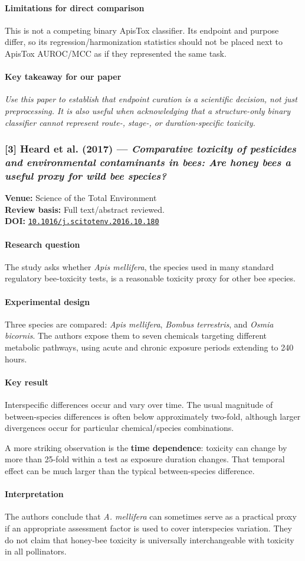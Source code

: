 \documentclass[11pt]{article}
\newcommand{\reviewfield}[2]{\paragraph{#1}#2}
\newcommand{\keytakeaway}[1]{\paragraph{Key takeaway for our paper}\emph{#1}}
\newcommand{\paperdoi}[1]{\href{https://doi.org/#1}{\texttt{#1}}}
\begin{document}
\reviewfield{Limitations for direct comparison}{
This is not a competing binary ApisTox classifier. Its endpoint and purpose differ, so its regression/harmonization statistics should not be placed next to ApisTox AUROC/MCC as if they represented the same task.
}

\keytakeaway{Use this paper to establish that endpoint curation is a scientific decision, not just preprocessing. It is also useful when acknowledging that a structure-only binary classifier cannot represent route-, stage-, or duration-specific toxicity.}

\subsubsection{[3] Heard et al. (2017) --- \textit{Comparative toxicity of pesticides and environmental contaminants in bees: Are honey bees a useful proxy for wild bee species?}}
\textbf{Venue:} Science of the Total Environment\\
\textbf{Review basis:} Full text/abstract reviewed.\\
\textbf{DOI:} \paperdoi{10.1016/j.scitotenv.2016.10.180}

\reviewfield{Research question}{
The study asks whether \textit{Apis mellifera}, the species used in many standard regulatory bee-toxicity tests, is a reasonable toxicity proxy for other bee species.
}

\reviewfield{Experimental design}{
Three species are compared: \textit{Apis mellifera}, \textit{Bombus terrestris}, and \textit{Osmia bicornis}. The authors expose them to seven chemicals targeting different metabolic pathways, using acute and chronic exposure periods extending to 240 hours.
}

\reviewfield{Key result}{
Interspecific differences occur and vary over time. The usual magnitude of between-species differences is often below approximately two-fold, although larger divergences occur for particular chemical/species combinations.

A more striking observation is the \textbf{time dependence}: toxicity can change by more than 25-fold within a test as exposure duration changes. That temporal effect can be much larger than the typical between-species difference.
}

\reviewfield{Interpretation}{
The authors conclude that \textit{A. mellifera} can sometimes serve as a practical proxy if an appropriate assessment factor is used to cover interspecies variation. They do not claim that honey-bee toxicity is universally interchangeable with toxicity in all pollinators.
}
\end{document}
